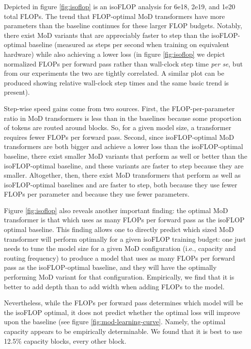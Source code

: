 \documentclass[11pt, a4paper, onecolumn, logo, copyright]{googledeepmind}
\begin{document}
Depicted in figure \ref{fig:isoflop} is an isoFLOP analysis for 6e18, 2e19, and 1e20 total FLOPs. The trend that FLOP-optimal MoD transformers have more parameters than the baseline continues for these larger FLOP budgets. Notably, there exist MoD variants that are appreciably faster to step than the isoFLOP-optimal baseline (measured as steps per second when training on equivalent hardware) while also achieving a lower loss (in figure \ref{fig:isoflop} we depict normalized FLOPs per forward pass rather than wall-clock step time \textit{per se}, but from our experiments the two are tightly correlated. A similar plot can be produced showing relative wall-clock step times and the same basic trend is present). 

Step-wise speed gains come from two sources. First, the FLOP-per-parameter ratio in MoD transformers is less than in the baselines because some proportion of tokens are routed around blocks. So, for a given model size, a transformer requires fewer FLOPs per forward pass. Second, since isoFLOP-optimal MoD transformers are both bigger and achieve a lower loss than the isoFLOP-optimal baseline, there exist smaller MoD variants that perform as well or better than the isoFLOP-optimal baseline, and these variants are faster to step because they are smaller. Altogether, then, there exist MoD transformers that perform as well as isoFLOP-optimal baselines and are faster to step, both because they use fewer FLOPs per parameter and because they use fewer parameters.

Figure \ref{fig:isoflop} also reveals another important finding: the optimal MoD transformer is that which uses as many FLOPs per forward pass as the isoFLOP optimal baseline. This finding allows one to directly predict which sized MoD transformer will perform optimally for a given isoFLOP training budget: one just needs to tune the model size for a given MoD configuration (i.e., capacity and routing frequency) to produce a model that uses as many FLOPs per forward pass as the isoFLOP-optimal baseline, and they will have the optimally performing MoD variant for that configuration. Empirically, we find that it is better to add depth than to add width when adding FLOPs to the model.

Nevertheless, while the FLOPs per forward pass determines which model will be the isoFLOP optimal, it does not predict whether the optimal loss will improve upon the baseline (see figure \ref{fig:mod-learning-curve}. Namely, the optimal capacity appears to be empirically determinable. We found that it is best to use 12.5\% capacity blocks, every other block. 
\end{document}
